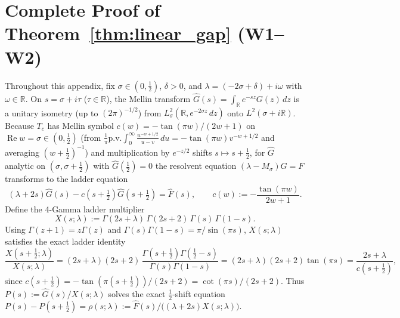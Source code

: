 \documentclass[11pt,a4paper]{article}
\begin{document}
\appendix

\section{Complete Proof of Theorem~\ref{thm:linear_gap} (W1--W2)}
\label{app:w123}

Throughout this appendix, fix $\sigma\in(0,\tfrac12)$, $\delta>0$, and
$\lambda=(-2\sigma+\delta)+i\omega$ with $\omega\in\mathbb{R}$.
On $s=\sigma+i\tau$ ($\tau\in\mathbb{R}$), the Mellin transform
$\widehat{G}(s)=\int_{\mathbb{R}} e^{-sz}G(z)\,dz$ is a unitary isometry
(up to $(2\pi)^{-1/2}$) from $L^2_\sigma(\mathbb{R}, e^{-2\sigma z}\,dz)$ onto $L^2(\sigma+i\mathbb{R})$.
Because $T_c$ has Mellin symbol $c(w)=-\tan(\pi w)/(2w+1)$ on $\operatorname{Re}w=\sigma\in(0,\tfrac12)$
(from $\frac{1}{\pi}\mathrm{p.v.}\int_0^\infty\frac{u^{-w+1/2}}{u-v}\,du=-\tan(\pi w)v^{-w+1/2}$ and averaging $(w+\tfrac12)^{-1}$)
and multiplication by $e^{-z/2}$ shifts $s\mapsto s+\tfrac12$, for $\widehat{G}$ analytic on $(\sigma,\sigma+\tfrac12)$ with
$\widehat{G}(\tfrac12)=0$ the resolvent equation $(\lambda - M_\sigma)G = F$ transforms to the ladder equation
\begin{equation}\label{eq:app_ladder}
(\lambda+2s)\widehat{G}(s) - c\!\left(s+\tfrac12\right)\widehat{G}\!\left(s+\tfrac12\right) = \widehat{F}(s),
\qquad c(w) := -\frac{\tan(\pi w)}{2w+1}.
\end{equation}
Define the 4-Gamma ladder multiplier
\begin{equation}\label{eq:app_X}
X(s;\lambda) := \Gamma(2s+\lambda)\,\Gamma(2s+2)\,\Gamma(s)\,\Gamma(1-s).
\end{equation}
Using $\Gamma(z+1)=z\Gamma(z)$ and $\Gamma(s)\Gamma(1-s)=\pi/\sin(\pi s)$,
$X(s;\lambda)$ satisfies the exact ladder identity
\[
\frac{X(s+\tfrac12;\lambda)}{X(s;\lambda)}
= (2s+\lambda)(2s+2)\,\frac{\Gamma(s+\tfrac12)\Gamma(\tfrac12-s)}{\Gamma(s)\Gamma(1-s)}
= (2s+\lambda)(2s+2)\tan(\pi s)
= \frac{2s+\lambda}{c(s+\tfrac12)},
\]
since $c(s+\tfrac12)=-\tan(\pi(s+\tfrac12))/(2s+2)=\cot(\pi s)/(2s+2)$.
Thus $P(s):=\widehat{G}(s)/X(s;\lambda)$ solves the exact $\tfrac12$-shift equation
$P(s)-P(s+\tfrac12)=\rho(s;\lambda):=\widehat{F}(s)/\bigl((\lambda+2s)X(s;\lambda)\bigr)$.
\end{document}
